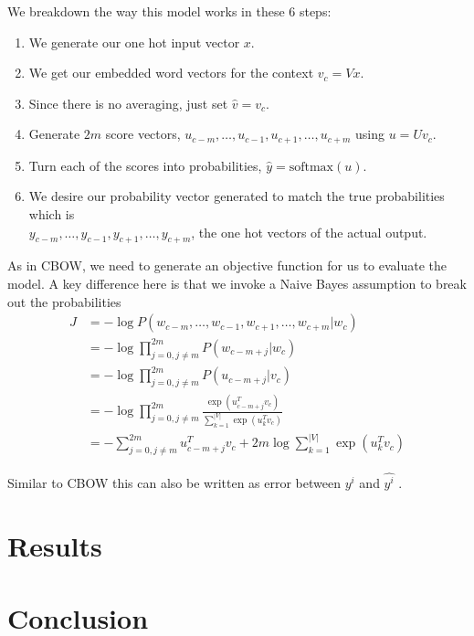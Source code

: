 \documentclass[12pt]{article}
\begin{document}
            We breakdown the way this model works in these 6 steps:
            \begin{enumerate}
                \item We generate our one hot input vector $x$.
                \item We get our embedded word vectors for the context $v_c = Vx$.
                \item Since there is no averaging, just set $\hat{v} = v_c$.
                \item Generate $2m$ score vectors, $u_{c-m}, \ldots, u_{c-1}, u_{c+1}, \ldots, u_{c+m}$ using $u = Uv_c$.
                \item Turn each of the scores into probabilities, $\hat{y} = \text{softmax}(u)$.
                \item We desire our probability vector generated to match the true probabilities which is \\
                 $y_{c-m}, \ldots, y_{c-1}, y_{c+1}, \ldots, y_{c+m}$, the one hot vectors of the actual output.
            \end{enumerate}
            
            As in CBOW, we need to generate an objective function for us to
            evaluate the model. A key difference here is that we invoke a Naive
            Bayes assumption to break out the probabilities
            \begin{align*}
                J &= - \log P(w_{c-m}, \ldots, w_{c-1}, w_{c+1}, \ldots, w_{c+m}|w_c) \\
                &= - \log \prod_{j=0, j \neq m}^{2m} P(w_{c-m+j}|w_c) \\
                &= - \log \prod_{j=0, j \neq m}^{2m} P(u_{c-m+j}|v_c) \\
                &= - \log \prod_{j=0, j \neq m}^{2m} \frac{\exp(u_{c-m+j}^T v_c)}{\sum_{k=1}^{|V|} \exp(u_k^T v_c)} \\
                &= - \sum_{j=0, j \neq m}^{2m} u_{c-m+j}^T v_c + 2m \log \sum_{k=1}^{|V|} \exp(u_k^T v_c)
            \end{align*}

            Similar to CBOW this can also be written as error between $y^i$ and $\hat{y^i}$ .


            

\section{Results}
\lipsum[5-6] %

\section{Conclusion}
\lipsum[7] %
\end{document}
